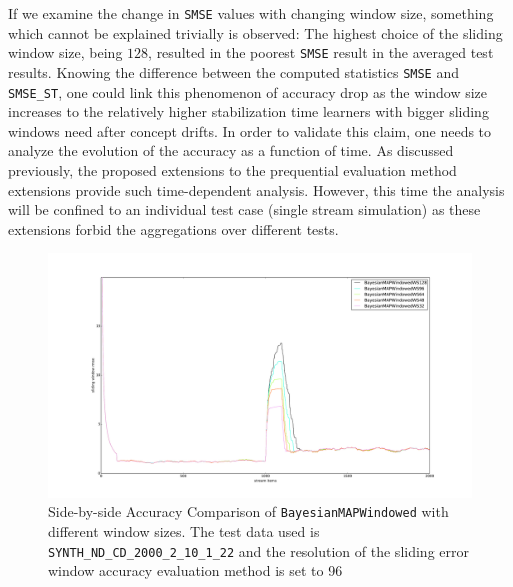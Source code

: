 If we examine the change in \texttt{SMSE} values with changing window size, something which cannot be explained trivially is observed: The highest choice of the sliding window size, being $128$, resulted in the poorest \texttt{SMSE} result in the averaged test results. Knowing the difference between the computed statistics \texttt{SMSE} and \texttt{SMSE\_ST}, one could link this phenomenon of accuracy drop as the window size increases to the relatively higher stabilization time learners with bigger sliding windows need after concept drifts. In order to validate this claim, one needs to analyze the evolution of the accuracy as a function of time. As discussed previously, the proposed extensions to the prequential evaluation method extensions provide such time-dependent analysis. However, this time the analysis will be confined to an individual test case (single stream simulation) as these extensions forbid the aggregations over different tests. 

\begin{figure}[htbp]
  \centering
    \includegraphics[width=\linewidth]{./Figures/wsize_on_stabilization_sidebyside_comp_res96.pdf}
  \caption{Side-by-side Accuracy Comparison of \texttt{BayesianMAPWindowed} with different window sizes. The test data used is \texttt{SYNTH\_ND\_CD\_2000\_2\_10\_1\_22} and the resolution of the sliding error window accuracy evaluation method is set to 96}
  \label{fig:wsize_on_stabilization_sidebyside_comp_res96}
\end{figure}

